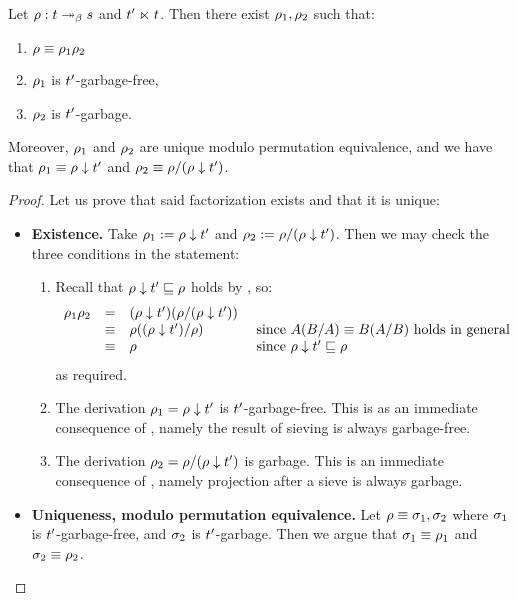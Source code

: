 
\begin{theorem}
Let $\rho : t \mathrel{\twoheadrightarrow_\beta} s$ and $t' \mathrel{\ltimes} t$.
Then there exist $\rho_1,\rho_2$ such that:
\begin{enumerate}
\item $\rho \equiv \rho_1\rho_2$
\item $\rho_1$ is $t'$-garbage-free,
\item $\rho_2$ is $t'$-garbage.
\end{enumerate}
Moreover, $\rho_1$ and $\rho_2$ are unique modulo permutation equivalence,
and we have that
$\rho_1 \equiv \rho \downarrow t'$ and $\rho_2 \equiv \rho/(\rho \downarrow t')$.
\end{theorem}
\begin{proof}
Let us prove that said factorization exists and that it is unique:
\begin{itemize}
\item {\bf Existence.}
  Take $\rho_1 := \rho \downarrow t'$ and $\rho_2 := \rho/(\rho \downarrow t')$.
  Then we may check the three conditions in the statement:
  \begin{enumerate}
  \item
    Recall that $\rho \downarrow t' \sqsubseteq \rho$ holds by , so:
    \[
      \begin{array}{rcll}
      \rho_1\rho_2
      & = & (\rho \downarrow t')(\rho/(\rho \downarrow t')) \\
      & \equiv & \rho((\rho \downarrow t')/\rho) & \text{ since $A(B/A) \equiv B(A/B)$ holds in general} \\
      & \equiv & \rho                                & \text{ since $\rho \downarrow t' \sqsubseteq \rho$}
      \end{array}
    \]
    as required.
  \item
    The derivation $\rho_1 = \rho \downarrow t'$
    is $t'$-garbage-free.
    This is as an immediate consequence of ,
    namely the result of sieving is always garbage-free.
  \item
    The derivation $\rho_2 = \rho/(\rho \downarrow t')$ is garbage.
    This is an immediate consequence of ,
    namely projection after a sieve is always garbage.
  \end{enumerate}
\item {\bf Uniqueness, modulo permutation equivalence.}
  Let $\rho \equiv \sigma_1,\sigma_2$
  where $\sigma_1$ is $t'$-garbage-free,
  and $\sigma_2$ is $t'$-garbage.
  Then we argue that $\sigma_1 \equiv \rho_1$ and $\sigma_2 \equiv \rho_2$.


\end{itemize}
\end{proof}
